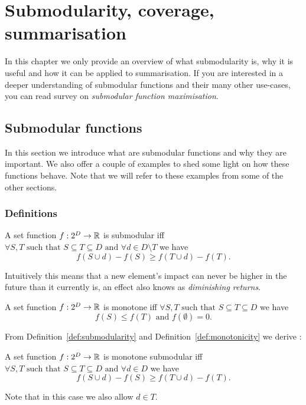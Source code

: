 \chapter{Submodularity, coverage, summarisation}
\label{cap:submodularity}

In this chapter we only provide an overview of what submodularity is, why it is
useful and how it can be applied to summarisation. If you are interested in a
deeper understanding of submodular functions and their many other use-cases,
you can read survey \cite{krause2012submodular} on \emph{submodular function
maximisation}.

\section{Submodular functions}
\label{sec:submod-functions}

In this section we introduce what are submodular functions and why they are
important. We also offer a couple of examples to shed some light on how these
functions behave. Note that we will refer to these examples from some of the
other sections.

\subsection{Definitions}

\begin{definition}[Submodularity]
  \label{def:submodularity}
  A set function \(f : 2^D \to \mathbb{R}\) is submodular iff
  \(\forall S, T \text{ such that } S \subseteq T \subseteq D
    \text{ and } \forall d \in D \setminus T\) we have
  \[f(S \cup {d}) - f(S) \geq f(T \cup {d}) - f(T).\]
\end{definition}
Intuitively this means that a new element's impact can never be higher in the
future than it currently is, an effect also knows as \emph{diminishing returns}.

\begin{definition}[Monotonicity]
  \label{def:monotonicity}
  A set function \(f : 2^D \to \mathbb{R}\) is monotone iff
  \(\forall S, T \text{ such that } S \subseteq T \subseteq D\) we have
  \[f(S) \leq f(T) \text{ and } f(\emptyset) = 0.\]
\end{definition}

From Definition~\ref{def:submodularity} and Definition~\ref{def:monotonicity}
we derive \cite{nemhauser1978analysis}:
\begin{proposition}
  \label{def:mono-submod}
  A set function \(f : 2^D \to \mathbb{R}\) is monotone submodular iff
  \(\forall S, T \text{ such that } S \subseteq T \subseteq D
    \text{ and } \forall d \in D\) we have
  \[f(S \cup {d}) - f(S) \geq f(T \cup {d}) - f(T).\]
\end{proposition}
Note that in this case we also allow \(d \in T\).

